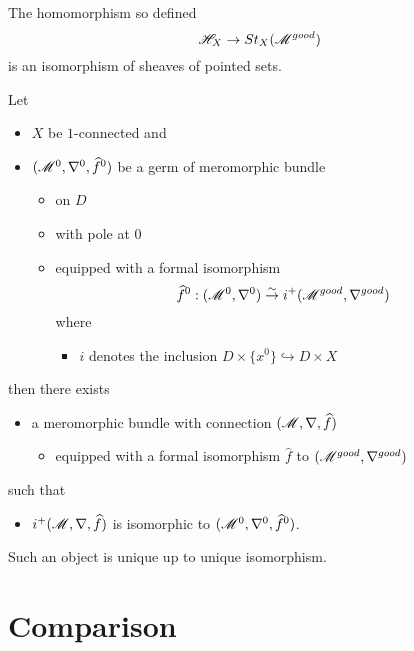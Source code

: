\begin{thm}
  The homomorphism so defined
  \[
    \mathscr{H}_X\to St_X(\mathscr{M}^{good})
  \]
  is an isomorphism of sheaves of pointed sets.
\end{thm}
\begin{cor}
  Let
  \begin{itemize}
    \item $X$ be $1$-connected and
    \item $(\mathscr{M}^0,\nabla^0,\widehat f^0)$ be a germ of meromorphic bundle
      \begin{itemize}
        \item on $D$
        \item with pole at $0$
        \item equipped with a formal isomorphism
          \[
            \widehat f^0:(\mathscr{M}^0,\nabla^0)
              \overset{\sim}{\to}
              i^+(\mathscr{M}^{good},\nabla^{good})
          \]
          where
          \begin{itemize}
            \item $i$ denotes the inclusion
              $D\times\{x^0\}\hookrightarrow D\times X$
          \end{itemize}
      \end{itemize}
  \end{itemize}
  then there exists
  \begin{itemize}
    \item a meromorphic bundle with connection $(\mathscr{M},\nabla,\widehat f)$
      \begin{itemize}
        \item equipped with a formal isomorphism $\hat f$ to
          $(\mathscr{M}^{good},\nabla^{good})$
      \end{itemize}
  \end{itemize}
  such that
  \begin{itemize}
    \item $i^+(\mathscr{M},\nabla,\widehat f)$ is isomorphic to
      $(\mathscr{M}^0,\nabla^0,\widehat f^0)$.
  \end{itemize}
  Such an object is unique up to unique isomorphism.
\end{cor}

\section{Comparison}
